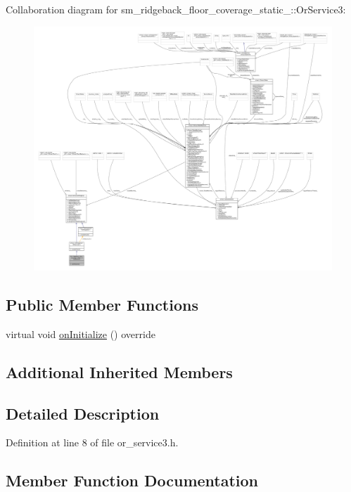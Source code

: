 Collaboration diagram for sm\+\_\+ridgeback\+\_\+floor\+\_\+coverage\+\_\+static\+\_\+:\+:Or\+Service3\+:
\nopagebreak
\begin{figure}[H]
\begin{center}
\leavevmode
\includegraphics[width=350pt]{classsm__ridgeback__floor__coverage__static__1_1_1OrService3__coll__graph}
\end{center}
\end{figure}
\subsection*{Public Member Functions}
\begin{DoxyCompactItemize}
\item 
virtual void \hyperlink{classsm__ridgeback__floor__coverage__static__1_1_1OrService3_adcef4f193a5947b6a3e3af4d05cd6be5}{on\+Initialize} () override
\end{DoxyCompactItemize}
\subsection*{Additional Inherited Members}


\subsection{Detailed Description}


Definition at line 8 of file or\+\_\+service3.\+h.



\subsection{Member Function Documentation}
\mbox{\label{classsm__ridgeback__floor__coverage__static__1_1_1OrService3_adcef4f193a5947b6a3e3af4d05cd6be5}} 
